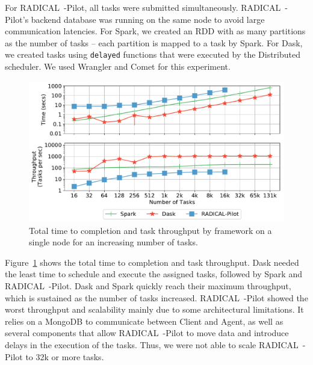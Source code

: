 For RADICAL~-Pilot, all tasks were submitted simultaneously. RADICAL~-Pilot's backend database was running on the same node to avoid large communication latencies.
For Spark, we created an RDD with as many partitions as the number of tasks -- each partition is mapped to a task by Spark.
For Dask, we created tasks using \texttt{delayed} functions that were executed by the Distributed scheduler.
We used Wrangler and Comet for this experiment.

\begin{figure}[t]
    \centering
    \includegraphics[width=.95\textwidth]{figures/data_analytics_hpc/task_par/dask_spark_rp_wrangler.pdf}
    \caption{Total time to completion and task throughput by framework on a single node for an increasing number of tasks.}
    \label{fig:dask_spark_rp_wrangler}
\end{figure}

Figure~\ref{fig:dask_spark_rp_wrangler} shows the total time to completion and task throughput.
Dask needed the least time to schedule and execute the assigned tasks, followed by Spark and RADICAL~-Pilot.
Dask and Spark quickly reach their maximum throughput, which is sustained as the number of tasks increased.
RADICAL~-Pilot showed the worst throughput and scalability mainly due to some architectural limitations.
It relies on a MongoDB to communicate between Client and Agent, as well as several components that allow RADICAL~-Pilot to move data and introduce delays in the execution of the tasks.
Thus, we were not able to scale RADICAL~-Pilot to 32k or more tasks.

